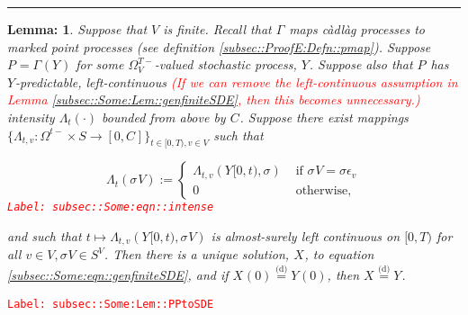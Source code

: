 \documentclass[12pt]{article}
\newcommand{\ra}{\rightarrow}
\newcommand{\te}{\text}
\newcommand{\ep}{\epsilon}
\newcommand{\tr}{\textcolor{red}}
\newcommand{\labe}[1]{\tr{\texttt{Label: #1}}}
\newcommand{\lin}{\rule{\linewidth}{0.4 pt}}
\newcommand{\deq}{\overset{\text{(d)}}{=}}			%
\renewcommand{\v}{v}							%
\renewcommand{\S}{S}							%
\newcommand{\s}{\sigma}							%
\newcommand{\sv}[1]{\s^{#1}}					%
\newcommand{\ev}[1]{\ep_{#1}}					%
\newcommand{\T}{T}								%
\newcommand{\OmegaV}[2]{\Omega_{#1}^{#2}}		%
\renewcommand{\t}{t}							%
\newcommand{\V}{V}									%
\newcommand{\XState}[1]{\S^{#1}}				%
\newcommand{\rxvt}[2]{X_{#1}{(#2)}}					%
\newcommand{\rxvtt}[2]{Y_{#1}{(#2)}}				%
\newcommand{\rxvts}[2]{X_{#1}{#2}}					%
\newcommand{\rxvtts}[2]{Y_{#1}{#2}}					%
\newcommand{\rp}[1]{P^{#1}}							%
\newcommand{\ratee}[1]{\Lambda_{#1}}				%
\newcommand{\const}[1]{C_{#1}}						%
\newcommand{\pmap}[1]{\Gamma_{#1}}				%
\newtheorem{lem}[thms]{Lemma: }
\begin{document}
\lin

\begin{lem}
Suppose that \(\V\) is finite. Recall that \(\pmap{}\) maps c\`adl\`ag processes to marked point processes (see definition \ref{subsec::ProofE:Defn::pmap}). Suppose \(\rp{} = \pmap{}(\rxvtts{}{})\) for some \(\OmegaV{\V}{\T-}\)-valued stochastic process, \(\rxvtts{}{}\). Suppose also that \(\rp{}\) has \(\rxvtts{}{}\)-predictable, left-continuous \tr{(If we can remove the left-continuous assumption in Lemma \ref{subsec::Some:Lem::genfiniteSDE}, then this becomes unnecessary.)} intensity \(\ratee{\t}(\cdot)\) bounded from above by \(\const{}\). Suppose there exist mappings \(\{\ratee{\t,\v}:\OmegaV{}{\t-}\times \S \ra [0,\const{}]\}_{\t\in[0,\T),\v\in \V}\) such that 

\begin{equation}
\ratee{\t}(\sv{}{\V}) := \begin{cases}
\ratee{\t,\v}(\rxvtts{}{[0,\t)},\s) &\te{ if } \sv{}{\V} = \s\ev{\v}\\
0 &\te{ otherwise,}
\end{cases}
\label{subsec::Some:eqn::intense}
\end{equation}
\labe{subsec::Some:eqn::intense}

and such that \(\t\mapsto \ratee{\t,\v}(\rxvtts{}{[0,\t)},\sv{}{\V})\) is almost-surely left continuous on \([0,\T)\) for all \(\v\in \V,\sv{}{\V}\in \S^\V\). Then there is a unique solution, \(\rxvts{}{}\), to equation \eqref{subsec::Some:eqn::genfiniteSDE}, and if \(\rxvt{}{0} \deq \rxvtt{}{0}\), then \(\rxvts{}{} \deq \rxvtts{}{}\).

\label{subsec::Some:Lem::PPtoSDE}
\end{lem}
\labe{subsec::Some:Lem::PPtoSDE}
\end{document}
